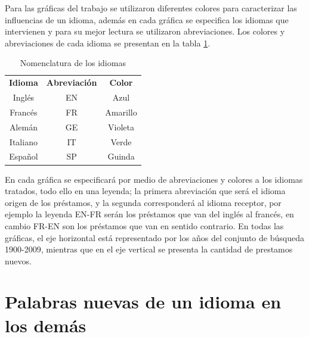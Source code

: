 
Para las gráficas del trabajo se utilizaron diferentes colores para
caracterizar las influencias de un idioma, además en cada gráfica se especifica
los idiomas que intervienen y para su mejor lectura se utilizaron
abreviaciones. Los colores y abreviaciones de cada idioma se presentan 
en la tabla \ref{tab.idcolor}.

\begin{table} %
	\centering
	\begin{tabular}{ccc}
		\textbf{Idioma} & \textbf{Abreviación} & \textbf{Color} \\
		Inglés          & EN                   & Azul           \\
		Francés         & FR                   & Amarillo       \\
		Alemán          & GE                   & Violeta        \\
		Italiano        & IT                   & Verde          \\
		Español         & SP                   & Guinda        
	\end{tabular}
	\caption{Nomenclatura de los idiomas}
	\label{tab.idcolor}
\end{table} %

En cada gráfica se especificará por medio de  abreviaciones y  colores a los
idiomas tratados, todo ello en una leyenda; la primera abreviación que será el
idioma origen de los préstamos, y la segunda corresponderá al idioma receptor,
por ejemplo  la leyenda EN-FR serán los préstamos que van del inglés al
francés, en cambio FR-EN son los préstamos que van en sentido contrario.
En todas las gráficas, el eje horizontal está representado por los años del
conjunto de búsqueda 1900-2009,  mientras que en el eje vertical se presenta la
cantidad de prestamos nuevos. 
\section{Palabras nuevas de un idioma en los demás} %

